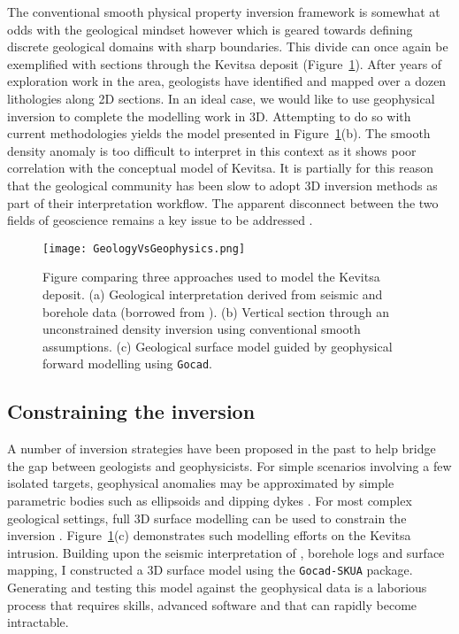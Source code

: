 The conventional smooth physical property inversion framework is somewhat at odds with the geological mindset however which is geared towards defining discrete geological domains with sharp boundaries. This divide can once again be exemplified with sections through the Kevitsa deposit (Figure~\ref{GeologyVsGeophysics}). After years of exploration work in the area, geologists have identified and mapped over a dozen lithologies along 2D sections. In an ideal case, we would like to use geophysical inversion to complete the modelling work in 3D. Attempting to do so with current methodologies yields the model presented in Figure~\ref{GeologyVsGeophysics}(b). The smooth density anomaly is too difficult to interpret in this context as it shows poor correlation with the conceptual model of Kevitsa. It is partially for this reason that the geological community has been slow to adopt 3D inversion methods as part of their interpretation workflow. The apparent disconnect between the two fields of geoscience remains a key issue to be addressed \cite[]{Li2019}.
\begin{figure}[h!]
\texttt{[image: GeologyVsGeophysics.png]}
\caption{Figure comparing three approaches used to model the Kevitsa deposit. (a) Geological interpretation derived from seismic and borehole data (borrowed from \cite{Koivisto2015}). (b) Vertical section through an unconstrained density inversion using conventional smooth assumptions. (c) Geological surface model guided by geophysical forward modelling using \texttt{Gocad}.}
\label{GeologyVsGeophysics}
\end{figure}

\subsection{Constraining the inversion}
A number of inversion strategies have been proposed in the past to help bridge the gap between geologists and geophysicists.
For simple scenarios involving a few isolated targets, geophysical anomalies may be approximated by simple parametric bodies such as ellipsoids \cite[]{McMillan2016} and dipping dykes \cite[]{Foss2006, Krahenbuhl2015}.
For most complex geological settings, full 3D surface modelling can be used to constrain the inversion \cite[]{Bosh2001, Fullagar2008}.
Figure~\ref{GeologyVsGeophysics}(c) demonstrates such modelling efforts on the Kevitsa intrusion. Building upon the seismic interpretation of \cite{Koivisto2015}, borehole logs and surface mapping, I constructed a 3D surface model using the \texttt{Gocad-SKUA} package. Generating and testing this model against the geophysical data is a laborious process that requires skills, advanced software and that can rapidly become intractable.

